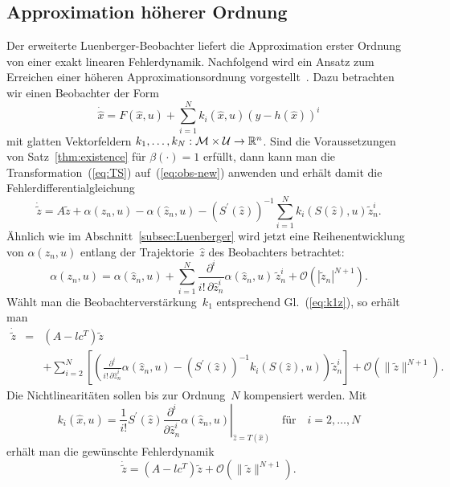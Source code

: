 \subsection{Approximation höherer Ordnung\label{sec:Higher-Order-Approximation}}

Der erweiterte Luenberger-Beobachter liefert die Approximation erster
Ordnung von einer exakt linearen Fehlerdynamik. Nachfolgend wird ein
Ansatz zum Erreichen einer höheren Approximationsordnung vorgestellt~\cite{roebenack2004ijc,roebenack2004pamm,roebenack2007ima}.
Dazu betrachten wir einen Beobachter der Form 
\begin{equation}
\dot{\hat{x}}=F(\hat{x},u)+\sum_{i=1}^{N}k_{i}(\hat{x},u)(y-h(\hat{x}))^{i}\label{eq:obs-new}
\end{equation}
mit glatten Vektorfeldern $k_{1},\ldots,k_{N}:\mathcal{M}\times\mathcal{U}\to{\mathbb{R}}^{n}$.
Sind die Voraussetzungen von Satz~\ref{thm:existence} für $\beta(\cdot)=1$
erfüllt, dann kann man die Transformation~(\ref{eq:TS}) auf~(\ref{eq:obs-new})
anwenden und erhält damit die Fehlerdifferentialgleichung 
\begin{equation}
\dot{\tilde{z}}=A\tilde{z}+\alpha(z_{n},u)-\alpha(\hat{z}_{n},u)-\left(S^{\prime}(\hat{z})\right)^{-1}\sum_{i=1}^{N}k_{i}(S(\hat{z}),u)\tilde{z}_{n}^{i}.\label{eq:error-dgl-new}
\end{equation}
Ähnlich wie im Abschnitt~\ref{subsec:Luenberger} wird jetzt eine
Reihenentwicklung von $\alpha(z_{n},u)$ entlang der Trajektorie~$\hat{z}$
des Beobachters betrachtet: 
\begin{equation}
\alpha(z_{n},u)=\alpha(\hat{z}_{n},u)+\sum_{i=1}^{N}\frac{\partial^{i}}{i!\,\partial\hat{z}_{n}^{i}}\alpha(\hat{z}_{n},u)\,\tilde{z}_{n}^{i}+\mathcal{O}\left(|\tilde{z}_{n}|^{N+1}\right).\label{eq:alpha-series-expansion}
\end{equation}
 Wählt man die Beobachterverstärkung~$k_{1}$ entsprechend Gl.~(\ref{eq:k1z}),
so erhält man 
\[
\begin{array}{lcl}
\dot{\tilde{z}} & = & \left(A-lc^{T}\right)\tilde{z}\\
 &  & +\sum_{i=2}^{N}\left[\left(\frac{\partial^{i}}{i!\,\partial\hat{z}_{n}^{i}}\alpha(\hat{z}_{n},u)-\left(S^{\prime}(\hat{z})\right)^{-1}k_{i}(S(\hat{z}),u)\right)\tilde{z}_{n}^{i}\right]+\mathcal{O}\left(\|\tilde{z}\|^{N+1}\right).
\end{array}
\]
Die Nichtlinearitäten sollen bis zur Ordnung~$N$ kompensiert werden.
Mit 
\begin{equation}
k_{i}(\hat{x},u)=\frac{1}{i!}\left.S^{\prime}(\hat{z})\frac{\partial^{i}}{\partial\hat{z}_{n}^{i}}\alpha(\hat{z}_{n},u)\right|_{\hat{z}=T(\hat{x})}\quad\textrm{für}\quad i=2,\ldots,N\label{eq:ki-z-new}
\end{equation}
erhält man die gewünschte Fehlerdynamik 
\begin{equation}
\dot{\tilde{z}}=\left(A-lc^{T}\right)\tilde{z}+\mathcal{O}\left(\|\tilde{z}\|^{N+1}\right).\label{eq:error-o-N}
\end{equation}
 

